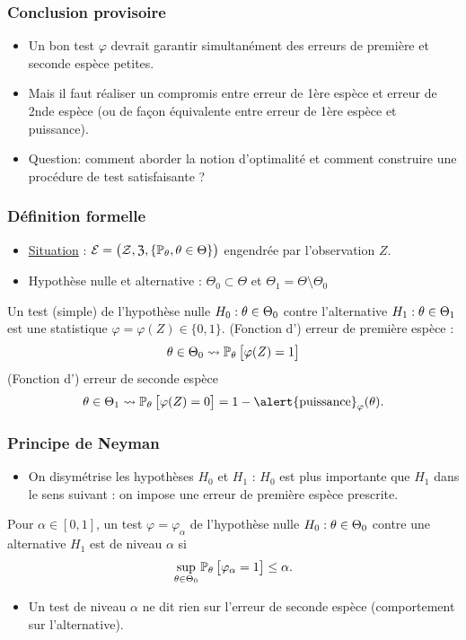 \begin{frame}
\frametitle{Conclusion provisoire}
\begin{itemize}
\item Un  bon test  $\varphi$ devrait garantir \alert{ simultanément} des erreurs de première et seconde espèce \alert{petites}.
\item Mais il faut réaliser un compromis entre erreur de 1ère espèce et erreur de 2nde espèce (ou de façon équivalente entre erreur de 1ère espèce et puissance).
\item \alert{Question:} comment aborder la notion d'optimalité et comment construire une procédure de test satisfaisante ?
\end{itemize}
\end{frame}



\begin{frame}
\frametitle{Définition formelle}
\begin{itemize}
\item \underline{Situation} : ${\mathcal E} = \big({\mathcal Z}, \mathfrak{Z}, \{\operatorname{{\mathbb P}}_\theta, \theta \in \Theta\}\big)$ engendrée par l'observation $Z$.
\item \alert{Hypothèse nulle et alternative} : $\Theta_0 \subset \Theta$ et $\Theta_1 = \Theta \setminus \Theta_0$
\end{itemize}
\begin{df} Un test (simple) de l'hypothèse nulle $H_0: \theta \in \Theta_0$ contre l'alternative $H_1:\theta \in \Theta_1$ est une statistique $\varphi  = \varphi(Z) \in \{0,1\}$.
 (Fonction d') \alert{erreur de première espèce} :
$$\theta \in \Theta_0 \leadsto \operatorname{{\mathbb P}}_\theta\big[\varphi(Z) = 1\big]$$
 (Fonction d') \alert{erreur de seconde espèce}
$$\truetheta \in \Theta_1 \leadsto \PP_\truetheta \big[\varphi(Z) = 0\big] = 1- \text{\alert{puissance}}_\varphi(\truetheta).$$
\end{df}
\end{frame}




\begin{frame}
\frametitle{Principe de Neyman}
\begin{itemize}
\item
On  \alert{disymétrise}  les hypothèses $H_0$ et $H_1$
: $H_0$ est  plus importante  que $H_1$ dans le sens suivant : on \alert{ impose} une \alert{erreur de première espèce prescrite}.
\end{itemize}
\begin{df}
Pour $\alpha \in [0,1]$, un test $\varphi = \varphi_\alpha$ de l'hypothèse nulle $H_0:\theta \in \Theta_0$ contre une alternative $H_1$ est de niveau $\alpha$ si
$$\sup_{\theta \in \Theta_0}\operatorname{{\mathbb P}}_\theta\big[\varphi_\alpha = 1\big] \leq \alpha.$$
\end{df}
\begin{itemize}
\item Un test de niveau $\alpha$ ne dit \alert{rien} sur l'erreur de seconde espèce (comportement sur l'alternative).
\end{itemize}
\end{frame}


